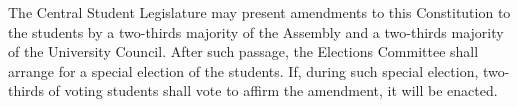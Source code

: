     The Central Student Legislature may present amendments to this Constitution to the students by a two-thirds majority of the Assembly and a two-thirds majority of the University Council. After such passage, the Elections Committee shall arrange for a special election of the students. If, during such special election, two-thirds of voting students shall vote to affirm the amendment, it will be enacted.